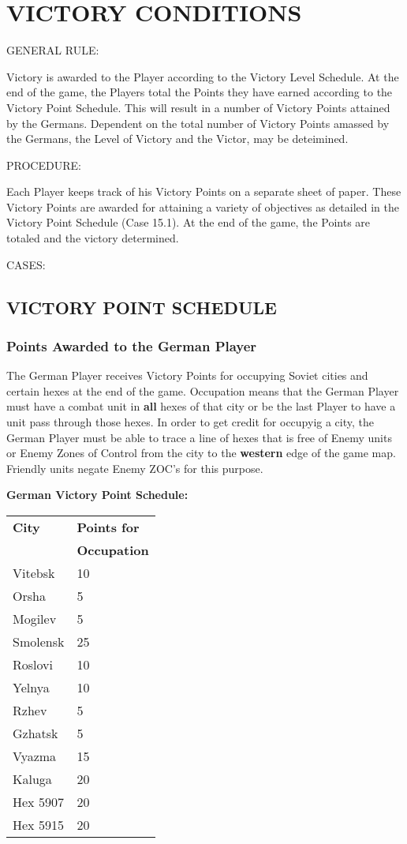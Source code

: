 \section{VICTORY CONDITIONS}

GENERAL RULE:

Victory is awarded to the Player according to the Victory Level Schedule. At the end of the game, the Players total the Points they have earned according to the Victory Point Schedule. This will result in a number of Victory Points attained by the Germans. Dependent on the total number of Victory Points amassed by the Germans, the Level of Victory and the Victor, may be deteimined.

PROCEDURE:

Each Player keeps track of his Victory Points on a separate sheet of paper. These Victory Points are awarded for attaining a variety of objectives as detailed in the Victory Point Schedule (Case 15.1). At the end of the game, the Points are totaled and the victory determined.

CASES:

\subsection{VICTORY POINT SCHEDULE}

\subsubsection{Points Awarded to the German Player}

The German Player receives Victory Points for occupying Soviet cities and certain hexes at the end of the game. Occupation means that the German Player must have a combat unit in \textbf{all} hexes of that city or be the last Player to have a unit pass through those hexes. In order to get credit for occupyig a city, the German Player must be able to trace a line of hexes that is free of Enemy units or Enemy Zones of Control from the city to the \textbf{western} edge of the game map. Friendly units negate Enemy ZOC's for this purpose.

\textbf{German Victory Point Schedule:}

\begin{tabular}{l@{\hskip 1.2in}l}
  \textbf{City} & \textbf{Points for}\\
  & \textbf{Occupation}\\
  Vitebsk & 10\\
  Orsha & 5\\
  Mogilev & 5\\
  Smolensk & 25\\
  Roslovi & 10\\
  Yelnya & 10\\
  Rzhev & 5\\
  Gzhatsk & 5\\
  Vyazma & 15\\
  Kaluga & 20\\
  Hex 5907 & 20\\
  Hex 5915 & 20
\end{tabular}

